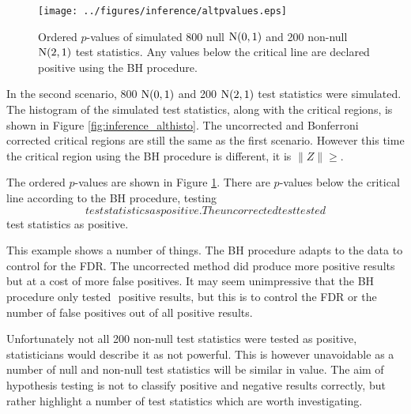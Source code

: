\begin{figure}
	\centering
	\texttt{[image: ../figures/inference/altpvalues.eps]}
    \caption{Ordered $p$-values of simulated 800 null $\operatorname{N}(0,1)$ and 200 non-null $\operatorname{N}(2,1)$ test statistics. Any values below the critical line are declared positive using the BH procedure.}
	\label{fig:altpvalues}
\end{figure}

In the second scenario, 800 $\operatorname{N}(0,1)$ and 200 $\operatorname{N}(2,1)$ test statistics were simulated. The histogram of the simulated test statistics, along with the critical regions, is shown in Figure \ref{fig:inference_althisto}. The uncorrected and Bonferroni corrected critical regions are still the same as the first scenario. However this time the critical region using the BH procedure is different, it is $\|Z\|\geqslant$.

The ordered $p$-values are shown in Figure \ref{fig:altpvalues}. There are $p$-values below the critical line according to the BH procedure, testing $$ test statistics as positive. The uncorrected test tested $$ test statistics as positive.

This example shows a number of things. The BH procedure adapts to the data to control for the FDR. The uncorrected method did produce more positive results but at a cost of more false positives. It may seem unimpressive that the BH procedure only tested $$ positive results, but this is to control the FDR or the number of false positives out of all positive results.

Unfortunately not all 200 non-null test statistics were tested as positive, statisticians would describe it as not powerful. This is however unavoidable as a number of null and non-null test statistics will be similar in value. The aim of hypothesis testing is not to classify positive and negative results correctly, but rather highlight a number of test statistics which are worth investigating.

